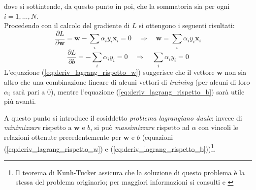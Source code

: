 dove si sottintende, da questo punto in poi, che la sommatoria sia per ogni $i=1,\ldots,N$.
\\
Procedendo con il calcolo del gradiente di $L$ si ottengono i seguenti risultati:
\begin{equation}
\label{eq:deriv_lagrang_rispetto_w}
\dfrac{\partial L}{\partial \mathbf{w}}=\mathbf{w}-\sum_i\alpha_i y_i\mathbf{x}_i=0 \quad\Rightarrow\quad \mathbf{w}=\sum_i\alpha_i y_i\mathbf{x}_i
\end{equation}
\begin{equation}
\label{eq:deriv_lagrang_rispetto_b}
\dfrac{\partial L}{\partial b}=-\sum_i\alpha_iy_i=0 \quad\Rightarrow\quad \sum_i\alpha_iy_i=0
\end{equation}
L'equazione (\ref{eq:deriv_lagrang_rispetto_w}) suggerisce che il vettore $\mathbf{w}$ non sia altro che una combinazione lineare di alcuni vettori di \emph{training} (per alcuni di loro $\alpha_i$ sarà pari a $0$), mentre l'equazione (\ref{eq:deriv_lagrang_rispetto_b}) sarà utile più avanti.

A questo punto si introduce il cosiddetto \textit{problema lagrangiano duale}: invece di \emph{minimizzare} rispetto a $\mathbf{w}$ e $b$, si può \emph{massimizzare} rispetto ad $\alpha$ con vincoli le relazioni ottenute precedentemente per $\mathbf{w}$ e $b$ (equazioni (\ref{eq:deriv_lagrang_rispetto_w}) e (\ref{eq:deriv_lagrang_rispetto_b}))\footnote{Il teorema di Kunh-Tucker assicura che la soluzione di questo problema è la stessa del problema originario; per maggiori informazioni si consulti \citep{Tutorial_burges} e \citep{Libro_SVM2}}.

